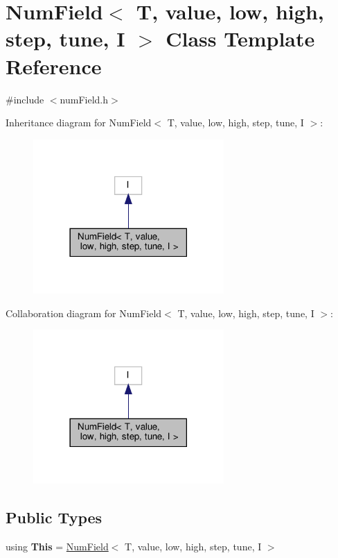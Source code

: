 \hypertarget{classNumField}{}\section{Num\+Field$<$ T, value, low, high, step, tune, I $>$ Class Template Reference}
\label{classNumField}


{\ttfamily \#include $<$num\+Field.\+h$>$}



Inheritance diagram for Num\+Field$<$ T, value, low, high, step, tune, I $>$\+:\nopagebreak
\begin{figure}[H]
\begin{center}
\leavevmode
\includegraphics[width=206pt]{classNumField__inherit__graph}
\end{center}
\end{figure}


Collaboration diagram for Num\+Field$<$ T, value, low, high, step, tune, I $>$\+:\nopagebreak
\begin{figure}[H]
\begin{center}
\leavevmode
\includegraphics[width=206pt]{classNumField__coll__graph}
\end{center}
\end{figure}
\subsection*{Public Types}
\begin{DoxyCompactItemize}
\item 
\mbox{\label{classNumField_a2f08690bb95c68a70e2941d5cdd4b85c}} 
using {\bfseries This} = \hyperlink{classNumField}{Num\+Field}$<$ T, value, low, high, step, tune, I $>$
\end{DoxyCompactItemize}
